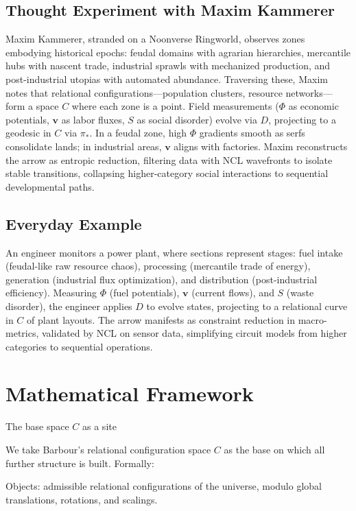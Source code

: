 \documentclass[11pt]{article}
\theoremstyle{plain}
\theoremstyle{definition}
\begin{document}
\subsection{Thought Experiment with Maxim Kammerer}
Maxim Kammerer, stranded on a Noonverse Ringworld, observes zones embodying historical epochs: feudal domains with agrarian hierarchies, mercantile hubs with nascent trade, industrial sprawls with mechanized production, and post-industrial utopias with automated abundance. Traversing these, Maxim notes that relational configurations—population clusters, resource networks—form a space $C$ where each zone is a point. Field measurements ($\Phi$ as economic potentials, $\mathbf{v}$ as labor fluxes, $S$ as social disorder) evolve via $D$, projecting to a geodesic in $C$ via $\pi_*$. In a feudal zone, high $\Phi$ gradients smooth as serfs consolidate lands; in industrial areas, $\mathbf{v}$ aligns with factories. Maxim reconstructs the arrow as entropic reduction, filtering data with NCL wavefronts to isolate stable transitions, collapsing higher-category social interactions to sequential developmental paths.

\subsection{Everyday Example}
An engineer monitors a power plant, where sections represent stages: fuel intake (feudal-like raw resource chaos), processing (mercantile trade of energy), generation (industrial flux optimization), and distribution (post-industrial efficiency). Measuring $\Phi$ (fuel potentials), $\mathbf{v}$ (current flows), and $S$ (waste disorder), the engineer applies $D$ to evolve states, projecting to a relational curve in $C$ of plant layouts. The arrow manifests as constraint reduction in macro-metrics, validated by NCL on sensor data, simplifying circuit models from higher categories to sequential operations.

\section{Mathematical Framework}

The base space $C$ as a site

We take Barbour’s relational configuration space $C$ as the base on which all further structure is built. Formally:

Objects: admissible relational configurations of the universe, modulo global translations, rotations, and scalings.
\end{document}

